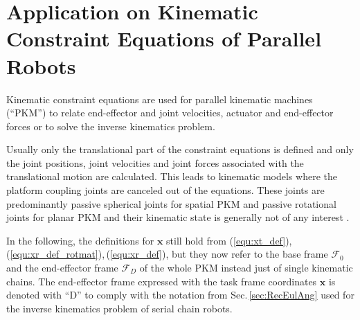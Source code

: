 \documentclass{svproc}
\newcommand{\bm}[1]{\boldsymbol{#1}}
\newcommand{\ks}[1]{{\mathcal{F}}_{#1}}
\begin{document}
\section{Application on Kinematic Constraint Equations of Parallel Robots}
\label{sec:ParRobKinConstr}

Kinematic constraint equations are used for parallel kinematic machines (``PKM'') to relate end-effector and joint velocities, actuator and end-effector forces or to solve the inverse kinematics problem.

Usually only the translational part of the constraint equations is defined and only the joint positions, joint velocities and joint forces associated with the translational motion are calculated.
This leads to kinematic models where the platform coupling joints are canceled out of the equations. These joints are predominantly passive spherical joints for spatial PKM and passive rotational joints for planar PKM and their kinematic state is generally not of any interest \cite{Merlet2006}.

In the following, the definitions for $\bm{x}$ still hold from  (\ref{equ:xt_def}),\,(\ref{equ:xr_def_rotmat}),\,(\ref{equ:xr_def}), but they now refer to the base frame $\ks{0}$ and the end-effector frame $\ks{D}$ of the whole PKM instead just of single kinematic chains.
The end-effector frame expressed with the task frame coordinates $\bm{x}$ is denoted with ``D'' to comply with the notation from Sec.\,\ref{sec:RecEulAng} used for the inverse kinematics problem of serial chain robots.
\end{document}
